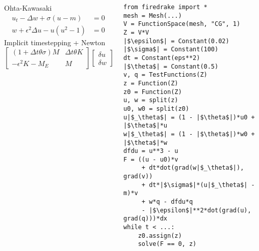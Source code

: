 \documentclass[presentation,aspectratio=43]{beamer}
\begin{document}
\begin{frame}[fragile]
  \begin{columns}
    \begin{column}{0.5\textwidth}
      \begin{block}{Ohta-Kawasaki}
        \small
        \begin{align*}
          u_t - \Delta w + \sigma(u - m) &= 0\\
          w + \epsilon^2 \Delta u - u(u^2 - 1) &= 0
        \end{align*}
        Implicit timestepping + Newton
        \begin{equation*}
          \begin{bmatrix}
            (1 + \Delta t \theta \sigma)M  & \Delta t\theta K \\
            -\epsilon^2 K - M_E & M
          \end{bmatrix}
          \begin{bmatrix}
            \delta u \\
            \delta w
          \end{bmatrix} =
          \begin{bmatrix}
            f_1 \\
            f_2
          \end{bmatrix}
        \end{equation*}
      \end{block}
    \end{column}
    \begin{column}{0.5\textwidth}
\begin{verbatim}
from firedrake import *
mesh = Mesh(...)
V = FunctionSpace(mesh, "CG", 1)
Z = V*V
|$\epsilon$| = Constant(0.02)
|$\sigma$| = Constant(100)
dt = Constant(eps**2)
|$\theta$| = Constant(0.5)
v, q = TestFunctions(Z)
z = Function(Z)
z0 = Function(Z)
u, w = split(z)
u0, w0 = split(z0)
u|$_\theta$| = (1 - |$\theta$|)*u0 + |$\theta$|*u
w|$_\theta$| = (1 - |$\theta$|)*w0 + |$\theta$|*w
dfdu = u**3 - u
F = ((u - u0)*v
     + dt*dot(grad(w|$_\theta$|), grad(v))
     + dt*|$\sigma$|*(u|$_\theta$| - m)*v
     + w*q - dfdu*q
     - |$\epsilon$|**2*dot(grad(u), grad(q)))*dx
while t < ...:
    z0.assign(z)
    solve(F == 0, z)
\end{verbatim}
    \end{column}
  \end{columns}
\end{frame}
\end{document}
